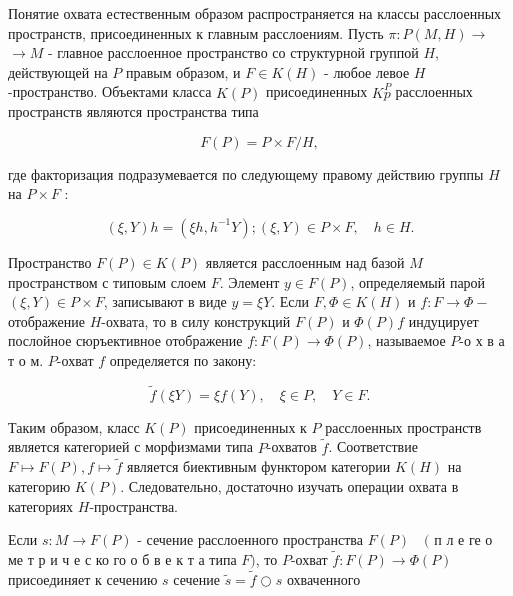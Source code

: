 \documentclass[10pt]{article}
\begin{document}
Понятие охвата естественным образом распространяется на классы расслоенных пространств, присоединенных к главным расслоениям. Пусть $\pi: P(M, H) \rightarrow$ $\rightarrow M$ - главное расслоенное пространство со структурной группой $H$, действующей на $P$ правым образом, и $F \in K(H)$ - любое левое $H$-пространство. Объектами класса $K(P)$ присоединенных $K \stackrel{P}{p}$ расслоенных пространств являются пространства типа



\[

F(P)=P \times F / H,

\]



где факторизация подразумевается по следующему правому действию группы $H$ на $P \times F$ :



\[

(\xi, Y) h=\left(\xi h, h^{-1} Y\right) ;(\xi, Y) \in P \times F, \quad h \in H .

\]



Пространство $F(P) \in K(P)$ является расслоенным над базой $M$ пространством с типовым слоем $F$. Элемент $y \in F(P)$, определяемый парой $(\xi, Y) \in P \times F$, записывают в виде $y=\xi Y$. Если $F, \Phi \in K(H)$ и $f: F \rightarrow \Phi-$ отображение $H$-охвата, то в силу конструкций $F(P)$ и $\Phi(P) f$ индуцирует послойное сюръективное отображение $f: F(P) \rightarrow \Phi(P)$, называемое $P$-о х в а т о м. $P$-охват $f$ определяется по закону:



\[

\tilde{f}(\xi Y)=\xi f(Y), \quad \xi \in P, \quad Y \in F .

\]



Таким образом, класс $K(P)$ присоединенных к $P$ расслоенных пространств является категорией с морфизмами типа $P$-охватов $\tilde{f}$. Соответствие $F \mapsto F(P), f \mapsto \tilde{f}$ является биективным функтором категории $K(H)$ на категорию $K(P)$. Следовательно, достаточно изучать операции охвата в категориях $H$-пространства.



Если $s: M \rightarrow F(P)$ - сечение расслоенного пространства $F(P) \quad($ п л е ге о ме т р и ч е с ко го о б в е к т а типа $F)$, то $P$-охват $\tilde{f}: F(P) \rightarrow \Phi(P)$ присоединяет к сечению $s$ сечение $\tilde{s}=\tilde{f} \bigcirc s$ охваченного
\end{document}
